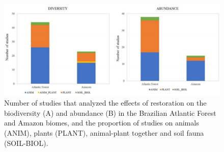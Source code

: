 %
\begin{figure}[H]
\includegraphics[width=1.0\linewidth]{pictureve/Bio-Cata-2.pdf}
\caption{Number of studies that analyzed the effects of restoration on the biodiversity (A) and abundance (B) in the Brazilian Atlantic Forest and Amazon biomes, and the proportion of studies on animals (ANIM), plants (PLANT), animal-plant together and soil fauna (SOIL-BIOL).}
\label{fig:Bio-Cata-2}
\end{figure}

